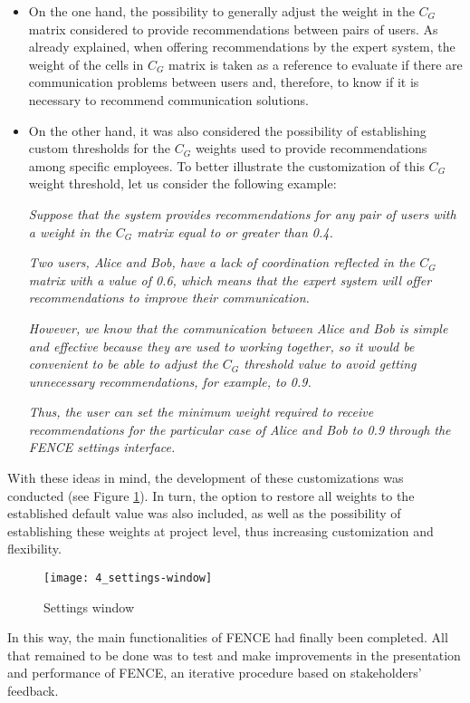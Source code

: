\begin{itemize}
\item On the one hand, the possibility to generally adjust the weight in the $C_G$ matrix considered to provide recommendations between pairs of users. As already explained, when offering recommendations by the expert system, the weight of the cells in $C_G$ matrix is taken as a reference to evaluate if there are communication problems between users and, therefore, to know if it is necessary to recommend communication solutions.
\item On the other hand, it was also considered the possibility of establishing custom thresholds for the $C_G$ weights used to provide recommendations among specific employees. To better illustrate the customization of this $C_G$ weight threshold, let us consider the following example:\newline


\indent\emph{Suppose that the system provides recommendations for any pair of users with a weight in the $C_G$ matrix equal to or greater than 0.4.\newline}

\indent\emph{Two users, Alice and Bob, have a lack of coordination reflected in the $C_G$ matrix with a value of 0.6, which means that the expert system will offer recommendations to improve their communication.\newline}

\indent\emph{However, we know that the communication between Alice and Bob is simple and effective because they are used to working together, so it would be convenient to be able to adjust the $C_G$ threshold value to avoid getting unnecessary recommendations, for example, to 0.9.\newline}

\indent\emph{Thus, the user can set the minimum weight required to receive recommendations for the particular case of Alice and Bob to 0.9 through the FENCE settings interface.\newline}


\end{itemize}

With these ideas in mind, the development of these customizations was conducted (see Figure \ref{fig:settings}). In turn, the option to restore all weights to the established default value was also included, as well as the possibility of establishing these weights at project level, thus increasing customization and flexibility.
\begin{figure}
	\centering
	\texttt{[image: 4\_settings-window]}
	\caption[Settings window]{Settings window}
	\label{fig:settings}
\end{figure}
In this way, the main functionalities of FENCE had finally been completed. All that remained to be done was to test and make improvements in the presentation and performance of FENCE, an iterative procedure based on stakeholders' feedback.

